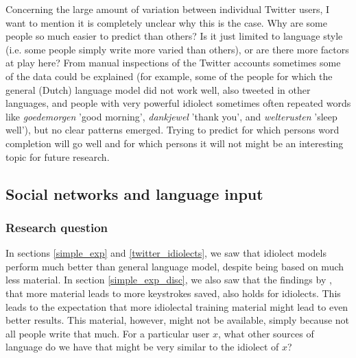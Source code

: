 \documentclass[12pt]{article}
\begin{document}
Concerning the large amount of variation between individual Twitter users, I want to mention it is completely unclear why this is the case. Why are some people so much easier to predict than others? Is it just limited to language style (i.e. some people simply write more varied than others), or are there more factors at play here? From manual inspections of the Twitter accounts sometimes some of the data could be explained (for example, some of the people for which the general (Dutch) language model did not work well, also tweeted in other languages, and people with very powerful idiolect sometimes often repeated words like \emph{goedemorgen} 'good morning', \emph{dankjewel} 'thank you', and \emph{welterusten} 'sleep well'), but no clear patterns emerged. Trying to predict for which persons word completion will go well and for which persons it will not might be an interesting topic for future research.

\subsection{Social networks and language input} \label{input_networks}

\subsubsection{Research question}


In sections \ref{simple_exp} and \ref{twitter_idiolects}, we saw that idiolect models perform much better than general language model, despite being based on much less material. In section \ref{simple_exp_disc}, we also saw that the findings by , that more material leads to more keystrokes saved, also holds for idiolects. This leads to the expectation that more idiolectal training material might lead to even better results. This material, however, might not be available, simply because not all people write that much. For a particular user $x$, what other sources of language do we have that might be very similar to the idiolect of $x$?
\end{document}
